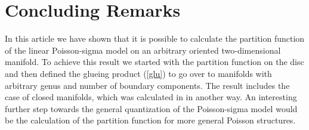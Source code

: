 \documentclass[a4paper,twoside,11pt]{article}
\numberwithin{equation}{section}
\begin{document}
\section{Concluding Remarks} 
%
In this article we have shown that it is possible to calculate the partition function of the linear
Poisson-sigma model on an arbitrary oriented two-dimensional manifold. To achieve this result we started with the partition function on the disc and then defined the glueing product (\ref{glu}) to go 
over to manifolds with arbitrary genus and number of boundary components. The result includes the 
case of closed manifolds, which was calculated in \cite{HS} in another way.  An interesting further step towards the general 
quantization of the Poisson-sigma model would be the calculation of the partition function for more general Poisson structures. 
\end{document}
